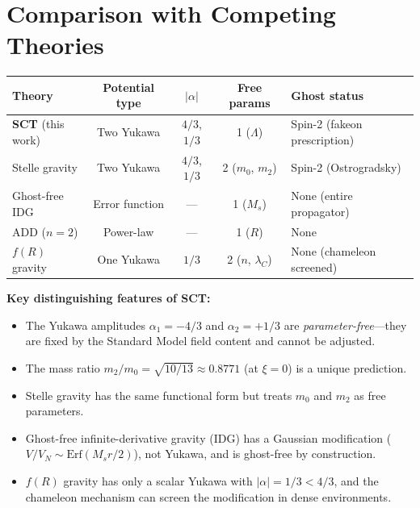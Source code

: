 \documentclass[11pt,a4paper]{article}
\begin{document}
\section{Comparison with Competing Theories}
\label{sec:comparison}

\begin{center}
\renewcommand{\arraystretch}{1.3}
\begin{tabular}{lcccp{4.5cm}}
  \toprule
  \textbf{Theory} & \textbf{Potential type} & $|\alpha|$ &
  \textbf{Free params} & \textbf{Ghost status} \\
  \midrule
  \textbf{SCT} (this work)
    & Two Yukawa & $4/3$, $1/3$ & 1 ($\Lambda$)
    & Spin-2 (fakeon prescription) \\
  Stelle gravity
    & Two Yukawa & $4/3$, $1/3$ & 2 ($m_0$, $m_2$)
    & Spin-2 (Ostrogradsky) \\
  Ghost-free IDG
    & Error function & --- & 1 ($M_s$)
    & None (entire propagator) \\
  ADD ($n=2$)
    & Power-law & --- & 1 ($R$)
    & None \\
  $f(R)$ gravity
    & One Yukawa & $1/3$ & 2 ($n$, $\lambda_C$)
    & None (chameleon screened) \\
  \bottomrule
\end{tabular}
\end{center}

\medskip

\noindent
\textbf{Key distinguishing features of SCT:}
\begin{itemize}[leftmargin=2em]
  \item The Yukawa amplitudes $\alpha_1 = -4/3$ and $\alpha_2 = +1/3$ are
    \emph{parameter-free}---they are fixed by the Standard Model field content
    and cannot be adjusted.
  \item The mass ratio $m_2/m_0 = \sqrt{10/13} \approx 0.8771$ (at $\xi = 0$)
    is a unique prediction.
  \item Stelle gravity has the same functional form but treats $m_0$ and $m_2$
    as free parameters.
  \item Ghost-free infinite-derivative gravity (IDG) has a Gaussian modification
    ($V/V_N \sim \text{Erf}(M_s r/2)$), not Yukawa, and is ghost-free by
    construction.
  \item $f(R)$ gravity has only a scalar Yukawa with $|\alpha| = 1/3 < 4/3$,
    and the chameleon mechanism can screen the modification in dense environments.
\end{itemize}
\end{document}
